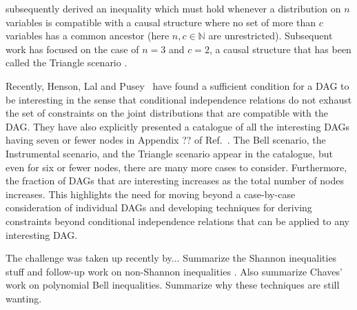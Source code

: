 \citet{steudel2010ancestors} subsequently derived an inequality which must hold whenever a distribution on $n$
variables is compatible with a causal structure where no set of more
than $c$ variables has a common ancestor (here $n,c \in \mathbb{N}$ are unrestricted).  Subsequent work has focused on the case of $n=3$ and $c=2$, a causal structure that has been called the Triangle scenario \cite{fritz2012bell,chaves2014novel}.

Recently, Henson, Lal and Pusey~\cite{pusey2014gdag} have found a sufficient condition for a DAG to be interesting in the sense that conditional independence relations do not exhaust the set  of constraints on the joint distributions that are compatible with the DAG.  They have also explicitly presented a catalogue of all the interesting DAGs having seven or fewer nodes in Appendix ?? of Ref.~\cite{pusey2014gdag}.  The Bell scenario, the Instrumental scenario, and the Triangle scenario appear in the catalogue, but even for six or fewer nodes, there are many more cases to consider.   Furthermore, the fraction of DAGs that are interesting increases as the total number of nodes increases.  This highlights the need for moving beyond a case-by-case consideration of individual DAGs and developing techniques for deriving constraints beyond conditional independence relations that can be applied to any interesting DAG.  

The challenge was taken up recently by... {\color{purple} Summarize the Shannon inequalities stuff \cite{fritz2013marginal,chaves2014novel,chaves2014informationinference} and follow-up work on non-Shannon inequalities \cite{weilenmann2016entropic,kela2016covariance,piannaar2016interesting}.  Also summarize Chaves' work on polynomial Bell inequalities.  Summarize why these techniques are still wanting.}


